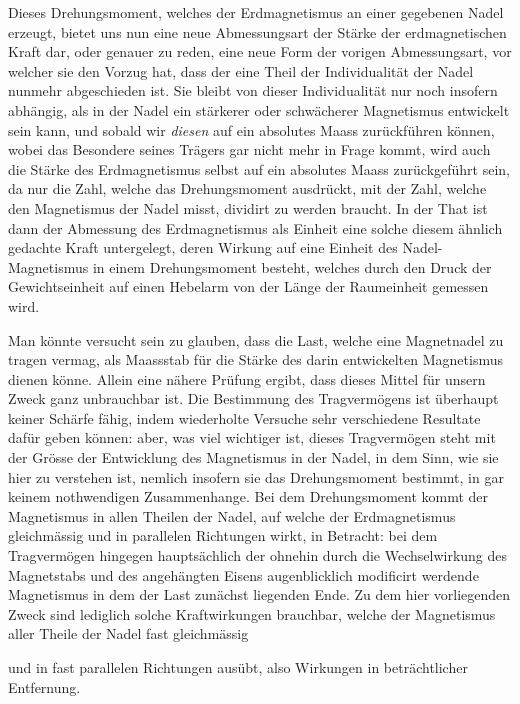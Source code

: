 Dieses Drehungsmoment, welches der Erdmagnetismus an einer gegebenen Nadel erzeugt, bietet uns nun eine neue Abmessungsart der Stärke der erdmagnetischen Kraft dar, oder genauer zu reden, eine neue Form der vorigen Abmessungsart, vor welcher sie den Vorzug hat, dass der eine Theil der Individualität der Nadel nunmehr abgeschieden ist. Sie bleibt von dieser Individualität nur noch insofern abhängig, als in der Nadel ein stärkerer oder schwächerer Magnetismus entwickelt sein kann, und sobald wir \textit{diesen} auf ein absolutes Maass zurückführen können, wobei das Besondere seines Trägers gar nicht mehr in Frage kommt, wird auch die Stärke des Erdmagnetismus selbst auf ein absolutes Maass zurückgeführt sein, da nur die Zahl, welche das Drehungsmoment ausdrückt, mit der Zahl, welche den Magnetismus der Nadel misst, dividirt zu werden braucht. In der That ist dann der Abmessung des Erdmagnetismus als Einheit eine solche diesem ähnlich gedachte Kraft untergelegt, deren Wirkung auf eine Einheit des Nadel-Magnetismus in einem Drehungsmoment besteht, welches durch den Druck der Gewichtseinheit auf einen Hebelarm von der Länge der Raumeinheit gemessen wird.

Man könnte versucht sein zu glauben, dass die Last, welche eine Magnetnadel zu tragen vermag, als Maassstab für die Stärke des darin entwickelten Magnetismus dienen könne. Allein eine nähere Prüfung ergibt, dass dieses Mittel für unsern Zweck ganz unbrauchbar ist. Die Bestimmung des Tragvermögens ist überhaupt keiner Schärfe fähig, indem wiederholte Versuche sehr verschiedene Resultate dafür geben können: aber, was viel wichtiger ist, dieses Tragvermögen steht mit der Grösse der Entwicklung des Magnetismus in der Nadel, in dem Sinn, wie sie hier zu verstehen ist, nemlich insofern sie das Drehungsmoment bestimmt, in gar keinem nothwendigen Zusammenhange. Bei dem Drehungsmoment kommt der Magnetismus in allen Theilen der Nadel, auf welche der Erdmagnetismus gleichmässig und in parallelen Richtungen wirkt, in Betracht: bei dem Tragvermögen hingegen hauptsächlich der ohnehin durch die Wechselwirkung des Magnetstabs und des angehängten Eisens augenblicklich modificirt werdende Magnetismus in dem der Last zunächst liegenden Ende. Zu dem hier vorliegenden Zweck sind lediglich solche Kraftwirkungen brauchbar, welche der Magnetismus aller Theile der Nadel fast gleichmässig
\par\clearpage
{}
\noindent und in fast parallelen Richtungen ausübt, also Wirkungen in beträchtlicher Entfernung.

